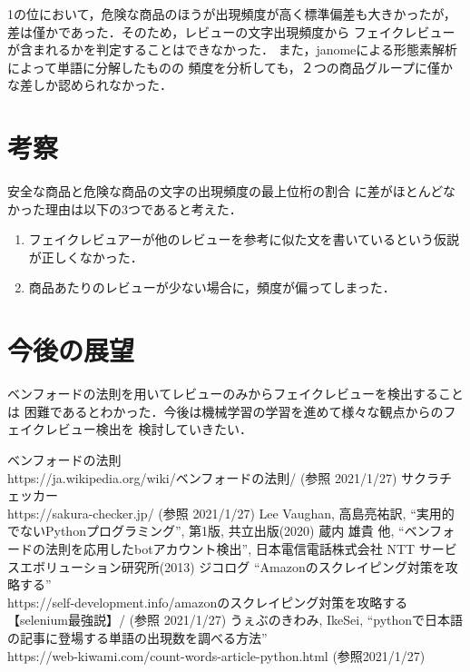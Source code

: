 \documentclass[a4paper, twocolumn]{jsarticle}
\begin{document}
1の位において，危険な商品のほうが出現頻度が高く標準偏差も大きかったが，
差は僅かであった．そのため，レビューの文字出現頻度から
フェイクレビューが含まれるかを判定することはできなかった．
また，janomeによる形態素解析によって単語に分解したものの
頻度を分析しても，２つの商品グループに僅かな差しか認められなかった．

\section{考察}
安全な商品と危険な商品の文字の出現頻度の最上位桁の割合
に差がほとんどなかった理由は以下の3つであると考えた．

\begin{enumerate}
  \item フェイクレビュアーが他のレビューを参考に似た文を書いているという仮説が正しくなかった．
  \item 商品あたりのレビューが少ない場合に，頻度が偏ってしまった．
\end{enumerate}


\section{今後の展望}
ベンフォードの法則を用いてレビューのみからフェイクレビューを検出することは
困難であるとわかった．今後は機械学習の学習を進めて様々な観点からのフェイクレビュー検出を
検討していきたい．

\begin{thebibliography}{99}
   ベンフォードの法則 \\ https://ja.wikipedia.org/wiki/ベンフォードの法則/ (参照 2021/1/27)
   サクラチェッカー \\ https://sakura-checker.jp/ (参照 2021/1/27)
   Lee Vaughan, 高島亮祐訳, ``実用的でないPythonプログラミング'', 第1版, 共立出版(2020)
   蔵内 雄貴 他, ``ベンフォードの法則を応用したbotアカウント検出'', 日本電信電話株式会社 NTT サービスエボリューション研究所(2013)
   ジコログ ``Amazonのスクレイピング対策を攻略する'' \\ https://self-development.info/amazonのスクレイピング対策を攻略する【selenium最強説】/ (参照 2021/1/27)
   うぇぶのきわみ, IkeSei, ``pythonで日本語の記事に登場する単語の出現数を調べる方法'' \\ https://web-kiwami.com/count-words-article-python.html (参照2021/1/27)
\end{thebibliography}
\end{document}
